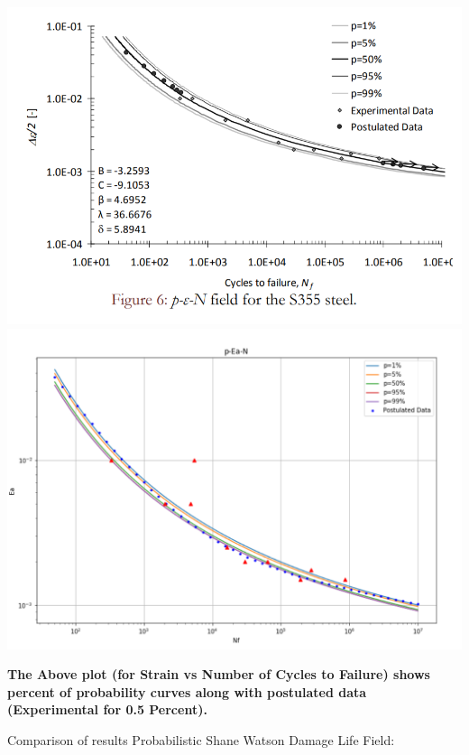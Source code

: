 \documentclass[11pt]{article}
\begin{document}
\includegraphics{images/p_e_n_paper.PNG}
\includegraphics{images/p_e_n_model.PNG}

\textbf{The Above plot (for Strain vs Number of Cycles to Failure) shows
percent of probability curves along with postulated data (Experimental
for 0.5 Percent).}

Comparison of results Probabilistic Shane Watson Damage Life Field:
\end{document}
